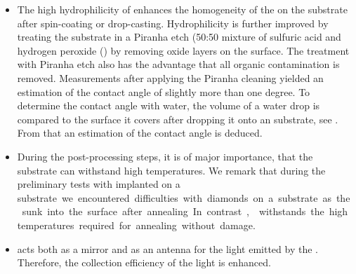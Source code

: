 	\begin{itemize}
		\item The high hydrophilicity of \ir enhances the homogeneity of the \nds on the substrate after spin-coating or drop-casting. Hydrophilicity is further improved by treating the substrate in a Piranha etch (50:50 mixture of sulfuric acid  and hydrogen peroxide () by removing oxide layers on the surface.
		The treatment with Piranha etch also has the advantage that all organic contamination is removed.
		Measurements after applying the Piranha cleaning yielded an estimation of the contact angle of slightly more than one degree.
		To determine the contact angle with water, the volume of a water drop is compared to the surface it covers after dropping it onto an \ir substrate, see . From that an estimation of the contact angle is deduced.
		\item During the post-processing steps, it is of major importance, that the substrate can withstand high temperatures.
		We remark that during the preliminary tests with implanted \nds on a \si substrate we encountered difficulties with diamonds on a \si substrate as the sunk into the surface after annealing.
		In contrast, \ir withstands the high temperatures required for annealing without damage.
		\item \Ir acts both as a mirror and as an antenna for the \fl light emitted by the \siv \cite{Neu2012a}.
		Therefore, the collection efficiency of the \fl light is enhanced.
	\end{itemize}



